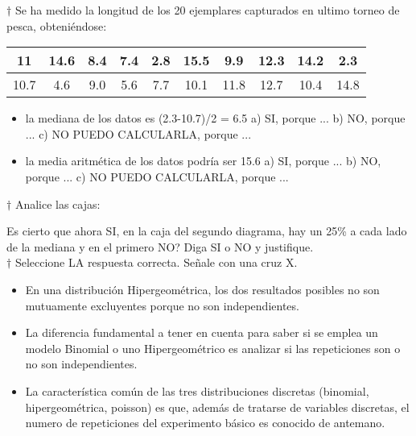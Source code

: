 \documentclass[10pt,a4paper]{article}
\begin{document}
$\dagger$ Se ha medido la longitud de los 20 ejemplares capturados en ultimo torneo de pesca, obteniéndose:
\begin{center}
	\begin{tabular}{|c|c|c|c|c|c|c|c|c|c|}
		\hline 
		11 & 14.6 & 8.4 & 7.4 & 2.8 & 15.5 & 9.9 & 12.3 & 14.2 & 2.3 \\ 
		\hline 
		10.7 & 4.6 & 9.0 & 5.6 & 7.7 & 10.1 & 11.8 & 12.7 & 10.4 & 14.8 \\ 
		\hline 
	\end{tabular}
\end{center} 

\begin{itemize}
	\item la mediana de los datos es (2.3-10.7)/2 = 6.5
	\subitem a) SI, porque ...
	\subitem b) NO, porque ...
	\subitem c) NO PUEDO CALCULARLA, porque ...
	\item la media aritmética de los datos podría ser 15.6
	\subitem a) SI, porque ...
	\subitem b) NO, porque ...
	\subitem c) NO PUEDO CALCULARLA, porque ...
\end{itemize}

$\dagger$  Analice las cajas:

\begin{center}
\end{center}

Es cierto que ahora SI, en la caja del segundo diagrama, hay un 25\%  a cada lado de la mediana y en el primero NO? Diga SI o NO y justifique.\\

$\dagger$ Seleccione LA respuesta correcta. Señale con una cruz X.
\begin{itemize}
	\renewcommand{\labelitemi}{\raisebox{-.25\height}{\huge$\square$}}
	\item En una distribución Hipergeométrica, los dos resultados posibles no son mutuamente excluyentes porque no son independientes.
	\item La diferencia fundamental a tener en cuenta para saber si se emplea un modelo Binomial o uno Hipergeométrico es analizar si las repeticiones son o no son independientes.
	\item La característica común de las tres distribuciones discretas (binomial, hipergeométrica, poisson) es que, además de tratarse de variables discretas, el numero de repeticiones del experimento básico es conocido de antemano.
\end{itemize}
\end{document}
